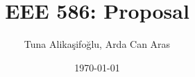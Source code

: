 \documentclass[a4paper, 12pt]{article}
\title{EEE 586: Proposal}
\author{Tuna Alikaşifoğlu, Arda Can Aras}
\date{\today}
\begin{document}
\begin{titlepage}
    \maketitle
    \thispagestyle{empty}
\end{titlepage}

\printbibliography{}
\end{document}
